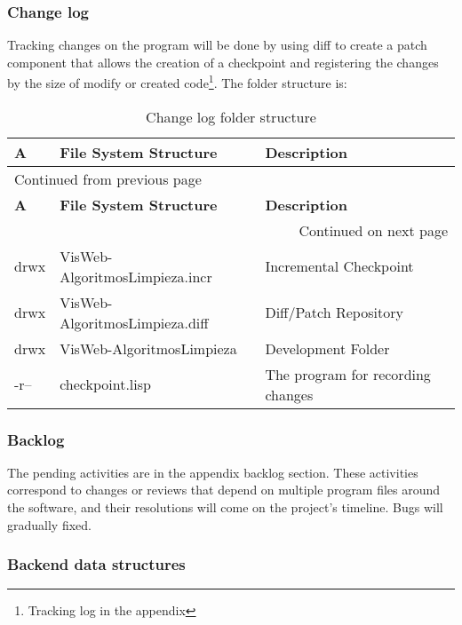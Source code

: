 \documentclass[a4paper]{article}
\begin{document}
\subsubsection{Change log}
\label{sec:orgf018222}

Tracking changes on the program will be done by using diff to create a patch component that allows the creation of a checkpoint and registering the changes by the size of modify or created code\footnote{Tracking log in the appendix}. The folder structure is:

\begin{longtable}{lll}
\caption{Change log folder structure}
\\[0pt]
\textbf{A} & \textbf{File System Structure} & \textbf{Description}\\[0pt]
\hline
\endfirsthead
\multicolumn{3}{l}{Continued from previous page} \\[0pt]
\hline

\textbf{A} & \textbf{File System Structure} & \textbf{Description} \\[0pt]

\hline
\endhead
\hline\multicolumn{3}{r}{Continued on next page} \\
\endfoot
\endlastfoot
\hline
drwx & VisWeb-AlgoritmosLimpieza.incr & Incremental Checkpoint\\[0pt]
drwx & VisWeb-AlgoritmosLimpieza.diff & Diff/Patch Repository\\[0pt]
drwx & VisWeb-AlgoritmosLimpieza & Development Folder\\[0pt]
-r-- & checkpoint.lisp & The program for recording changes\\[0pt]
\end{longtable}

\subsubsection{Backlog}
\label{sec:orgcfe7f4e}

The pending activities are in the appendix backlog section. These activities correspond to changes or reviews that depend on multiple program files around the software, and their resolutions will come on the project's timeline. Bugs will gradually fixed.

\subsubsection{Backend data structures}
\label{sec:orgfa76442}
\end{document}

